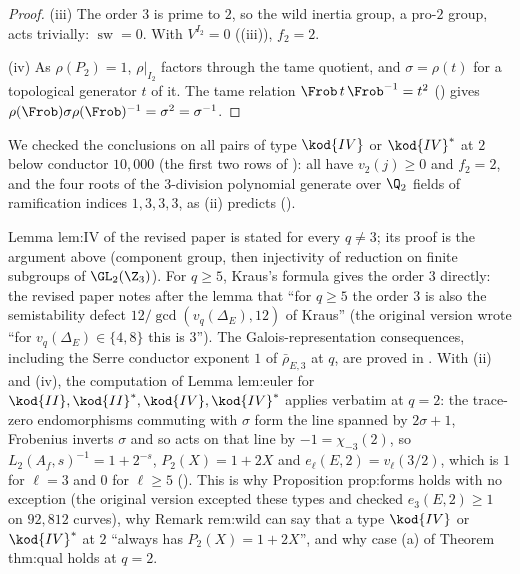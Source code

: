 \begin{proof}
(iii) The order $3$ is prime to $2$, so the wild inertia group, a pro-$2$ group, acts trivially: $\operatorname{sw}=0$. With
$V^{I_2}=0$ ((iii)), $f_2=2$.

(iv) As $\rho(P_2)=1$, $\rho|_{I_2}$ factors through the tame quotient, and $\sigma=\rho(t)$ for a topological generator $t$ of
it. The tame relation $\Frob\,t\,\Frob^{-1}=t^2$ () gives $\rho(\Frob)\sigma\rho(\Frob)^{-1}=\sigma^2=\sigma^{-1}$.
\end{proof}

We checked the conclusions on all pairs of type $\kod{IV}$ or $\kod{IV}^*$ at $2$ below conductor $10{,}000$ (the first two rows of
): all have
$v_2(j)\ge0$ and $f_2=2$, and the four roots of the $3$-division polynomial generate over $\Q_2$ fields of ramification
indices $1,3,3,3$, as (ii) predicts ().

\begin{paperlink}
Lemma lem:IV of the revised paper is stated for every $q\ne3$; its proof is the argument above (component group, then
injectivity of reduction on finite subgroups of $\GL_2(\Z_3)$). For $q\ge5$, Kraus's formula gives the order $3$ directly: the revised
paper notes after the lemma that ``for $q\ge5$ the order $3$ is also the semistability defect $12/\gcd(v_q(\Delta_E),12)$ of
Kraus'' (the original version wrote ``for $v_q(\Delta_E)\in\{4,8\}$ this is $3$''). The Galois-representation consequences, including the Serre conductor
exponent $1$ of $\bar\rho_{E,3}$ at $q$, are proved in . With (ii) and (iv), the computation of Lemma lem:euler
for $\kod{II},\kod{II}^*,\kod{IV},\kod{IV}^*$ applies verbatim at $q=2$: the trace-zero endomorphisms commuting with $\sigma$ form
the line spanned by $2\sigma+1$, Frobenius inverts $\sigma$ and so acts on that line by $-1=\chi_{-3}(2)$, so
$L_2(A_f,s)^{-1}=1+2^{-s}$, $P_2(X)=1+2X$ and $e_\ell(E,2)=v_\ell(3/2)$, which is $1$ for $\ell=3$ and $0$ for $\ell\ge5$
(). This is why Proposition prop:forms holds with no exception (the original version excepted these
types and checked $e_3(E,2)\ge1$ on $92{,}812$ curves), why Remark rem:wild can say that a type $\kod{IV}$ or $\kod{IV}^*$ at $2$
``always has $P_2(X)=1+2X$'', and why case (a) of Theorem thm:qual holds at $q=2$.
\end{paperlink}

